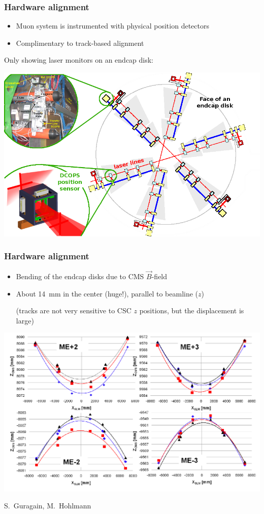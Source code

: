 \documentclass[compress]{beamer}
\begin{document}
\begin{frame}
\frametitle{Hardware alignment}
\begin{itemize}
\item Muon system is instrumented with physical position detectors
\item Complimentary to track-based alignment
\end{itemize}

Only showing laser monitors on an endcap disk:

\vspace{0.1 cm}
\hfill \includegraphics[width=0.9\linewidth]{hardware_alignment.png}

\end{frame}

\begin{frame}
\frametitle{Hardware alignment}

\begin{itemize}
\item Bending of the endcap disks due to CMS $\vec{B}$-field
\item About 14~mm in the center (huge!), parallel to beamline ($z$)

\scriptsize (tracks are not very sensitive to CSC $z$ positions, but the displacement is large)
\end{itemize}

\includegraphics[width=\linewidth]{hardware_diskbending.png}

\vspace{-0.35 cm}
\scriptsize S.~Guragain, M.~Hohlmann
\end{frame}
\end{document}
